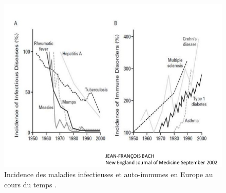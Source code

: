 \documentclass[12pt,a4paper]{article}
\begin{document}
\begin{figure}[ht]
\begin{center}
\includegraphics[scale=0.5]{img/allergie_infection.jpg}\hfill
\end{center}
\caption{Incidence des maladies infectieuses et auto-immunes en Europe au cours du temps \cite{Bach2002}. }
\label{hyigienisme}
\end{figure}
\end{document}
